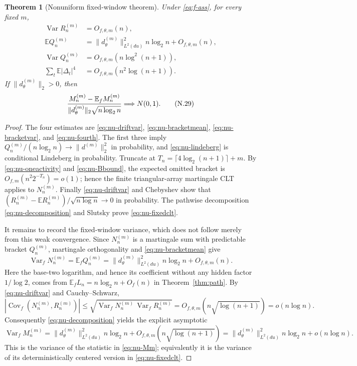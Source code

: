 \documentclass[11pt]{article}
\numberwithin{equation}{section}
\newtheorem{theorem}{Theorem}[section]
\newcommand{\E}{\mathbb E}\newcommand{\Pp}{\mathbb P}
\newcommand{\Var}{\operatorname{Var}}\newcommand{\Cov}{\operatorname{Cov}}
\newcommand{\1}{\mathbf 1}\newcommand{\F}{\mathcal F}\newcommand{\D}{\mathcal D}
\begin{document}
\begin{theorem}[Nonuniform fixed-window theorem]\label{thm:finite}
Under \eqref{eq:f-ass}, for every fixed $m$,
\begin{align*}
 \Var R_n^{(m)}&=O_{f,\theta,m}(n),\\
 \E Q_n^{(m)}&=\|d_\theta^{(m)}\|_{L^2(du)}^2n\log_2n+O_{f,\theta,m}(n),\\
 \Var Q_n^{(m)}&=O_{f,\theta,m}(n\log^2(n+1)),\\
 \sum_t\E|\Delta_t|^4&=O_{f,\theta,m}(n^2\log(n+1)).
\end{align*}
If $\|d_\theta^{(m)}\|_2>0$, then
\begin{equation}\label{eq:nu-fixedclt}
 {M_n^{(m)}-\E_fM_n^{(m)}\over
  \|d_\theta^{(m)}\|_2\sqrt{n\log_2n}}\Longrightarrow N(0,1). \tag{N.29}
\end{equation}
\end{theorem}
\begin{proof}
The four estimates are \eqref{eq:nu-driftvar}, \eqref{eq:nu-bracketmean},
\eqref{eq:nu-bracketvar}, and \eqref{eq:nu-fourth}.  The first three imply
$Q_n^{(m)}/(n\log_2n)\to\|d^{(m)}\|_2^2$ in probability, and
\eqref{eq:nu-lindeberg} is conditional Lindeberg in probability.  Truncate
at $T_n=\lceil4\log_2(n+1)\rceil+m$.  By \eqref{eq:nu-oneactivity} and
\eqref{eq:nu-Bbound}, the expected omitted bracket is
$O_{f,m}(n^2 2^{-T_n})=o(1)$; hence the finite triangular-array martingale
CLT applies to $N_n^{(m)}$.  Finally \eqref{eq:nu-driftvar} and Chebyshev show
that $(R_n^{(m)}-\E R_n^{(m)})/\sqrt{n\log n}\to0$ in probability.
The pathwise decomposition \eqref{eq:nu-decomposition} and Slutsky prove
\eqref{eq:nu-fixedclt}.

It remains to record the fixed-window variance, which does not follow merely
from this weak convergence.  Since $N_n^{(m)}$ is a martingale sum with
predictable bracket $Q_n^{(m)}$, martingale orthogonality and
\eqref{eq:nu-bracketmean} give
\[
 \Var_f N_n^{(m)}=\E_f Q_n^{(m)}
 =\|d_\theta^{(m)}\|_{L^2(du)}^2 n\log_2 n+O_{f,\theta,m}(n).
\]
Here the base-two logarithm, and hence its coefficient without any hidden
factor $1/\log 2$, comes from $\E_fL_n=n\log_2n+O_f(n)$ in
Theorem~\ref{thm:path}.  By \eqref{eq:nu-driftvar} and Cauchy--Schwarz,
\[
 \left|\Cov_f(N_n^{(m)},R_n^{(m)})\right|
 \le \sqrt{\Var_fN_n^{(m)}\,\Var_fR_n^{(m)}}
 =O_{f,\theta,m}(n\sqrt{\log(n+1)})=o(n\log n).
\]
Consequently \eqref{eq:nu-decomposition} yields the explicit asymptotic
\begin{equation}\label{eq:nu-fixedvar}
 \Var_f M_n^{(m)}
 =\|d_\theta^{(m)}\|_{L^2(du)}^2 n\log_2 n
   +O_{f,\theta,m}(n\sqrt{\log(n+1)})
 =\|d_\theta^{(m)}\|_{L^2(du)}^2 n\log_2 n+o(n\log n).       \tag{N.29a}
\end{equation}
This is the variance of the statistic in \eqref{eq:nu-Mm}; equivalently it is
the variance of its deterministically centered version in
\eqref{eq:nu-fixedclt}.
\end{proof}
\end{document}
